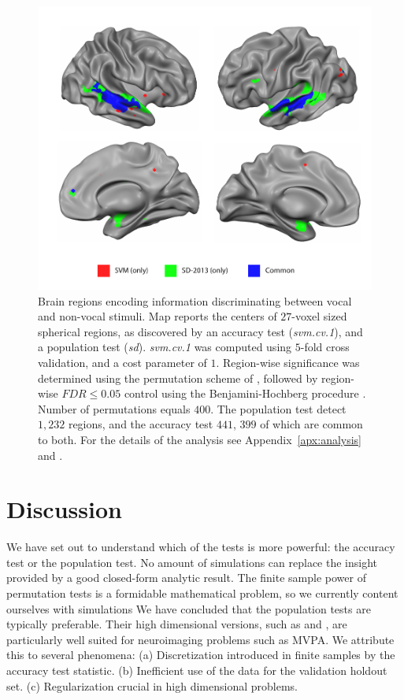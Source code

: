 \documentclass[12pt,a4paper]{article}
\theoremstyle{definition}
\begin{document}
\begin{figure}[th]
\centering
\includegraphics[width=0.7\linewidth]{"art/svm_vs_SD"}
\caption{\footnotesize
Brain regions encoding information discriminating between vocal and non-vocal stimuli.
Map reports the centers of $27$-voxel sized spherical regions, as discovered by an accuracy test (\emph{svm.cv.1}), and a population test (\emph{sd}). 
\emph{svm.cv.1} was computed using $5$-fold cross validation, and a cost parameter of $1$. 
Region-wise significance was determined using the permutation scheme of \cite{stelzer_statistical_2013}, followed by region-wise $FDR \leq 0.05$ control using the Benjamini-Hochberg procedure \citep{benjamini_controlling_1995}.
Number of permutations equals $400$.
The population test detect $1,232$ regions, and the accuracy test $441$, $399$ of which are common to both.
For the details of the analysis see Appendix~\ref{apx:analysis} and \cite{gilron_quantifying_2016}.  
  }
\label{fig:read_data}
\end{figure}








\section{Discussion}
\label{sec:discussion}

We have set out to understand which of the tests is more powerful: the accuracy test or the population test. 
No amount of simulations can replace the insight provided by a good closed-form analytic result. 
The finite sample power of permutation tests is a formidable mathematical problem, so we currently content ourselves with simulations 
We have concluded that the population tests are typically preferable. 
Their high dimensional versions, such as \cite{srivastava_multivariate_2007} and \cite{schafer_shrinkage_2005},  are particularly well suited for neuroimaging problems such as MVPA.
We attribute this to several phenomena: \newline
(a) Discretization introduced in finite samples by the accuracy test statistic. \newline
(b) Inefficient use of the data for the validation holdout set. \newline
(c) Regularization crucial in high dimensional problems. \newline
\end{document}

